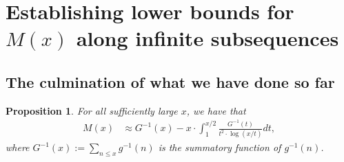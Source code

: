 \documentclass[11pt,reqno,a4letter]{article}
\numberwithin{figure}{section}
\numberwithin{table}{section}
\theoremstyle{plain}
\newtheorem{prop}[theorem]{Proposition}
\numberwithin{theorem}{section}
\theoremstyle{definition}
\begin{document}
\newpage
\section{Establishing lower bounds for $M(x)$ along infinite subsequences} 
\label{Section_KeyApplications} 

\subsection{The culmination of what we have done so far} 

\begin{prop}
\label{prop_Mx_SBP_IntegralFormula} 
For all sufficiently large $x$, we have that 
\begin{align} 
\label{eqn_pf_tag_v2-restated_v2} 
M(x) & \approx G^{-1}(x) - x \cdot \int_1^{x/2} \frac{G^{-1}(t)}{t^2 \cdot \log(x/t)} dt, 
\end{align} 
where $G^{-1}(x) := \sum_{n \leq x} g^{-1}(n)$ is the summatory function of $g^{-1}(n)$. 
\end{prop} 
\end{document}
